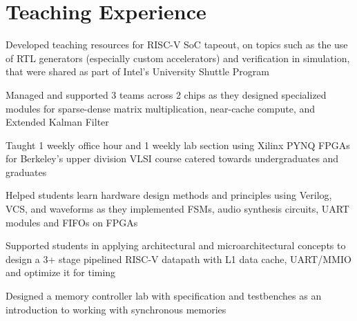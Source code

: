 \documentclass[]{deedy-resume-openfont}
\begin{document}

\section{Teaching Experience}

\vspace{\topsep}
\begin{tightemize}
\item Developed teaching resources for RISC-V SoC tapeout, on topics such as the use of RTL generators (especially custom accelerators) and verification in simulation, that were shared as part of Intel's University Shuttle Program
\item Managed and supported 3 teams across 2 chips as they designed specialized modules for sparse-dense matrix multiplication, near-cache compute, and Extended Kalman Filter
\end{tightemize}
\sectionsep

\vspace{\topsep} %
\begin{tightemize}
\item Taught 1 weekly office hour and 1 weekly lab section using Xilinx PYNQ FPGAs for Berkeley's upper division VLSI course catered towards undergraduates and graduates
\item Helped students learn hardware design methods and principles using Verilog, VCS, and waveforms as they implemented FSMs, audio synthesis circuits, UART modules and FIFOs on FPGAs
\item Supported students in applying architectural and microarchitectural concepts to design a 3+ stage pipelined RISC-V datapath with L1 data cache, UART/MMIO and optimize it for timing
\item Designed a memory controller lab with specification and testbenches as an introduction to working with synchronous memories
\end{tightemize}
\sectionsep
\end{document}
